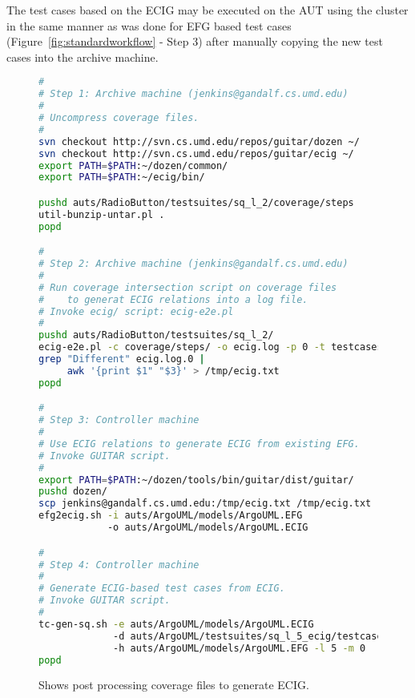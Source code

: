 The test cases based on the ECIG may be executed on the AUT using the cluster in the same manner as was done for EFG based test cases (Figure~\ref{fig:standardworkflow} - Step 3) after manually copying the new test cases into the archive machine.

\begin{figure}
   \scriptsize{
   \begin{lstlisting}[language=sh]
#
# Step 1: Archive machine (jenkins@gandalf.cs.umd.edu)
#
# Uncompress coverage files.
#
svn checkout http://svn.cs.umd.edu/repos/guitar/dozen ~/
svn checkout http://svn.cs.umd.edu/repos/guitar/ecig ~/
export PATH=$PATH:~/dozen/common/
export PATH=$PATH:~/ecig/bin/

pushd auts/RadioButton/testsuites/sq_l_2/coverage/steps
util-bunzip-untar.pl .
popd

#
# Step 2: Archive machine (jenkins@gandalf.cs.umd.edu)
#
# Run coverage intersection script on coverage files
#    to generat ECIG relations into a log file.
# Invoke ecig/ script: ecig-e2e.pl
#
pushd auts/RadioButton/testsuites/sq_l_2/
ecig-e2e.pl -c coverage/steps/ -o ecig.log -p 0 -t testcases/
grep "Different" ecig.log.0 |
     awk '{print $1" "$3}' > /tmp/ecig.txt
popd

#
# Step 3: Controller machine
#
# Use ECIG relations to generate ECIG from existing EFG.
# Invoke GUITAR script.
#
export PATH=$PATH:~/dozen/tools/bin/guitar/dist/guitar/
pushd dozen/
scp jenkins@gandalf.cs.umd.edu:/tmp/ecig.txt /tmp/ecig.txt
efg2ecig.sh -i auts/ArgoUML/models/ArgoUML.EFG
            -o auts/ArgoUML/models/ArgoUML.ECIG 

#
# Step 4: Controller machine
#
# Generate ECIG-based test cases from ECIG.
# Invoke GUITAR script.
#
tc-gen-sq.sh -e auts/ArgoUML/models/ArgoUML.ECIG
             -d auts/ArgoUML/testsuites/sq_l_5_ecig/testcases
             -h auts/ArgoUML/models/ArgoUML.EFG -l 5 -m 0
popd
   \end{lstlisting}
   }
   \caption{Shows post processing coverage files to generate ECIG.}
   \label{fig:ecig}
\end{figure}
